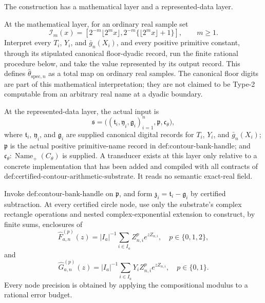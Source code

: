 The construction has a mathematical layer and a represented-data layer.

At the mathematical layer, for an ordinary real sample set
\[
 \mathcal I_m(x)=
 \left[2^{-m}\lfloor2^m x\rfloor,
       2^{-m}\{\lfloor2^m x\rfloor+1\}\right],
 \qquad m\ge1.
\]
Interpret every \(T_i\), \(Y_i\), and \(\bar g_n(X_i)\), and every positive primitive constant, through its stipulated canonical floor-dyadic record, run the finite rational procedure below, and take the value represented by its output record.  This defines \(\widehat\theta_{\mathrm{spec},n}\) as a total map on ordinary real samples.  The canonical floor digits are part of this mathematical interpretation; they are not claimed to be Type-2 computable from an arbitrary real name at a dyadic boundary.

At the represented-data layer, the actual input is
\[
 \mathfrak s=
 \bigl((\mathfrak t_i,\mathfrak y_i,\mathfrak g_i)_{i=1}^n,
       \mathfrak p,\mathfrak c_{\theta}\bigr),
\]
where \(\mathfrak t_i\), \(\mathfrak y_i\), and \(\mathfrak g_i\) are supplied canonical digital records for \(T_i\), \(Y_i\), and \(\bar g_n(X_i)\); \(\mathfrak p\) is the actual positive primitive-name record in \(\text{def:contour-bank-handle}\); and \(\mathfrak c_{\theta}:\operatorname{Name}_{+}(C_{\theta})\) is supplied.  A transducer exists at this layer only relative to a concrete implementation that has been added and compiled with all contracts of \(\text{def:certified-contour-arithmetic-substrate}\).  It reads no semantic exact-real field.

Invoke \(\text{def:contour-bank-handle}\) on \(\mathfrak p\), and form \(\mathfrak z_i=\mathfrak t_i-\mathfrak g_i\) by certified subtraction.  At every certified circle node, use only the substrate's complex rectangle operations and nested complex-exponential extension to construct, by finite sums, enclosures of
\[
 \widehat F_{a,n}^{(p)}(z)
 =|I_a|^{-1}\sum_{i\in I_a}Z_{n,i}^{p}e^{zZ_{n,i}},
 \quad p\in\{0,1,2\},
\]
and
\[
 \widehat G_{a,n}^{(p)}(z)
 =|I_a|^{-1}\sum_{i\in I_a}Y_iZ_{n,i}^{p}e^{zZ_{n,i}},
 \quad p\in\{0,1\}.
\]
Every node precision is obtained by applying the compositional modulus to a rational error budget.

